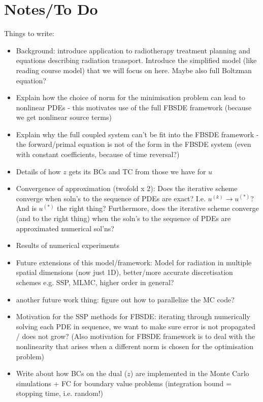 \documentclass{article}  %
\begin{document}
\section{Notes/To Do}
Things to write:
\begin{itemize}
    \item Background: introduce application to radiotherapy treatment planning and equations describing radiation transport. Introduce the simplified model (like reading course model) that we will focus on here. Maybe also full Boltzman equation?
    \item Explain how the choice of norm for the minimisation problem can lead to nonlinear PDEs - this motivates use of the full FBSDE framework (because we get nonlinear source terms)
    \item Explain why the full coupled system can't be fit into the FBSDE framework - the forward/primal equation is not of the form in the FBSDE system (even with constant coefficients, because of time reversal?)
    \item Details of how $z$ gets its BCs and TC from those we have for $u$
    \item Convergence of approximation (twofold x 2): Does the iterative scheme converge when soln's to the sequence of PDEs are exact? I.e. $u^{(k)} \rightarrow u^{(*)}$? And is $u^{(*)}$ the right thing? Furthermore, does the iterative scheme converge (and to the right thing) when the soln's to the sequence of PDEs are approximated numerical sol'ns?
    \item Results of numerical experiments
    \item Future extensions of this model/framework: Model for radiation in multiple spatial dimensions (now just 1D), better/more accurate discretisation schemes e.g. SSP, MLMC, higher order in general?
    \item another future work thing: figure out how to parallelize the MC code?
    \item Motivation for the SSP methods for FBSDE: iterating through numerically solving each PDE in sequence, we want to make sure error is not propagated / does not grow? (Also motivation for FBSDE framework is to deal with the nonlinearity that arises when a different norm is chosen for the optimisation problem)
    \item Write about how BCs on the dual ($z$) are implemented in the Monte Carlo simulations + FC for boundary value problems (integration bound = stopping time, i.e. random!)
\end{itemize}
\end{document}
